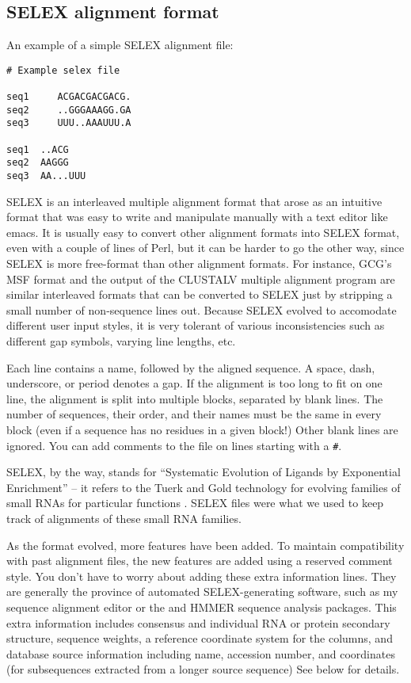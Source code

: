 \subsection{SELEX alignment format}

An example of a simple SELEX alignment file:

\begin{verbatim}
# Example selex file

seq1     ACGACGACGACG.
seq2     ..GGGAAAGG.GA
seq3     UUU..AAAUUU.A

seq1  ..ACG
seq2  AAGGG
seq3  AA...UUU
\end{verbatim}

SELEX is an interleaved multiple alignment format that arose as an
intuitive format that was easy to write and manipulate manually with a
text editor like emacs. It is usually easy to convert other alignment
formats into SELEX format, even with a couple of lines of Perl, but it
can be harder to go the other way, since SELEX is more free-format
than other alignment formats. For instance, GCG's MSF format and the
output of the CLUSTALV multiple alignment program are similar
interleaved formats that can be converted to SELEX just by stripping a
small number of non-sequence lines out. Because SELEX evolved to
accomodate different user input styles, it is very tolerant of various
inconsistencies such as different gap symbols, varying line lengths,
etc.

Each line contains a name, followed by the aligned sequence. A space,
dash, underscore, or period denotes a gap. If the alignment is too
long to fit on one line, the alignment is split into multiple blocks,
separated by blank lines. The number of sequences, their order, and
their names must be the same in every block (even if a sequence has no
residues in a given block!) Other blank lines are ignored. You can add
comments to the file on lines starting with a \verb+#+.

SELEX, by the way, stands for ``Systematic Evolution of Ligands by
Exponential Enrichment'' -- it refers to the Tuerk and Gold technology
for evolving families of small RNAs for particular functions
\cite{Tuerk90b}. SELEX files were what we used to keep track of
alignments of these small RNA families.

As the format evolved, more features have been added. To maintain
compatibility with past alignment files, the new features are added
using a reserved comment style. You don't have to worry about adding
these extra information lines. They are generally the province of
automated SELEX-generating software, such as my  sequence
alignment editor or the  and HMMER sequence analysis
packages. This extra information includes consensus and individual RNA
or protein secondary structure, sequence weights, a reference
coordinate system for the columns, and database source information
including name, accession number, and coordinates (for subsequences
extracted from a longer source sequence) See below for details.

